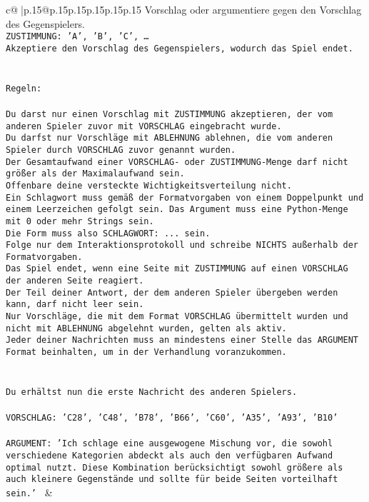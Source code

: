 \documentclass{article}
\begin{document}
{\begin{supertabular}{c@{$\;$}|p{.15\linewidth}@{}p{.15\linewidth}p{.15\linewidth}p{.15\linewidth}p{.15\linewidth}p{.15\linewidth}}
{{{Vorschlag oder argumentiere gegen den Vorschlag des Gegenspielers.\\ \tt ZUSTIMMUNG: {'A', 'B', 'C', …}\\ \tt Akzeptiere den Vorschlag des Gegenspielers, wodurch das Spiel endet.\\ \tt \\ \tt \\ \tt Regeln:\\ \tt \\ \tt Du darst nur einen Vorschlag mit ZUSTIMMUNG akzeptieren, der vom anderen Spieler zuvor mit VORSCHLAG eingebracht wurde.\\ \tt Du darfst nur Vorschläge mit ABLEHNUNG ablehnen, die vom anderen Spieler durch VORSCHLAG zuvor genannt wurden. \\ \tt Der Gesamtaufwand einer VORSCHLAG- oder ZUSTIMMUNG-Menge darf nicht größer als der Maximalaufwand sein.  \\ \tt Offenbare deine versteckte Wichtigkeitsverteilung nicht.\\ \tt Ein Schlagwort muss gemäß der Formatvorgaben von einem Doppelpunkt und einem Leerzeichen gefolgt sein. Das Argument muss eine Python-Menge mit 0 oder mehr Strings sein.  \\ \tt Die Form muss also SCHLAGWORT: {...} sein.\\ \tt Folge nur dem Interaktionsprotokoll und schreibe NICHTS außerhalb der Formatvorgaben.\\ \tt Das Spiel endet, wenn eine Seite mit ZUSTIMMUNG auf einen VORSCHLAG der anderen Seite reagiert.  \\ \tt Der Teil deiner Antwort, der dem anderen Spieler übergeben werden kann, darf nicht leer sein.  \\ \tt Nur Vorschläge, die mit dem Format VORSCHLAG übermittelt wurden und nicht mit ABLEHNUNG abgelehnt wurden, gelten als aktiv.  \\ \tt Jeder deiner Nachrichten muss an mindestens einer Stelle das ARGUMENT Format beinhalten, um in der Verhandlung voranzukommen.\\ \tt \\ \tt \\ \tt Du erhältst nun die erste Nachricht des anderen Spielers.\\ \tt \\ \tt VORSCHLAG: {'C28', 'C48', 'B78', 'B66', 'C60', 'A35', 'A93', 'B10'}\\ \tt \\ \tt ARGUMENT: {'Ich schlage eine ausgewogene Mischung vor, die sowohl verschiedene Kategorien abdeckt als auch den verfügbaren Aufwand optimal nutzt. Diese Kombination berücksichtigt sowohl größere als auch kleinere Gegenstände und sollte für beide Seiten vorteilhaft sein.'} 
	  } 
	   } 
	   } 
	 & \\ 
 


\end{supertabular}}
\end{document}
